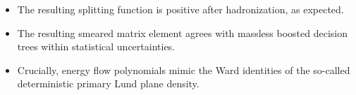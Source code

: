 \begin{itemize}
  \item The resulting splitting function is positive after hadronization, as expected.
  \item The resulting smeared matrix element agrees with massless boosted decision trees within statistical uncertainties.
  \item Crucially, energy flow polynomials mimic the Ward identities of the so-called deterministic primary Lund plane density.
\end{itemize}

